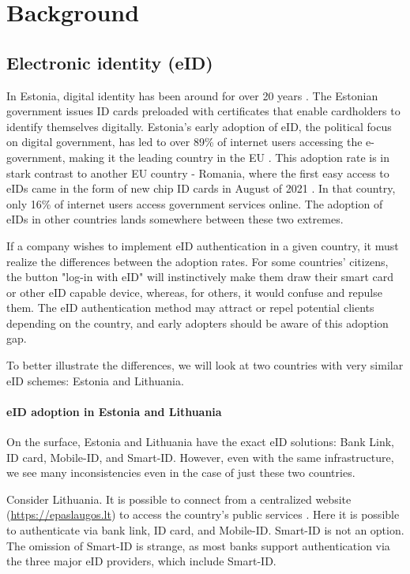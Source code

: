 \section{Background}

\subsection{Electronic identity (eID)}

In Estonia, digital identity has been around for over 20 years \cite{eelaw-idcard}. The Estonian government issues ID cards preloaded with certificates that enable cardholders to identify themselves digitally. Estonia's early adoption of eID, the political focus on digital government, has led to over 89\% of internet users accessing the e-government, making it the leading country in the EU \cite{eu-desi}. This adoption rate is in stark contrast to another EU country - Romania, where the first easy access to eIDs came in the form of new chip ID cards in August of 2021 \cite{romania-adopts-eid}. In that country, only 16\% of internet users access government services online. The adoption of eIDs in other countries lands somewhere between these two extremes.

If a company wishes to implement eID authentication in a given country, it must realize the differences between the adoption rates. For some countries' citizens, the button "log-in with eID" will instinctively make them draw their smart card or other eID capable device, whereas, for others, it would confuse and repulse them. The eID authentication method may attract or repel potential clients depending on the country, and early adopters should be aware of this adoption gap.

To better illustrate the differences, we will look at two countries with very similar eID schemes: Estonia and Lithuania.

\paragraph{eID adoption in Estonia and Lithuania}

On the surface, Estonia and Lithuania have the exact eID solutions: Bank Link, ID card, Mobile-ID, and Smart-ID. However, even with the same infrastructure, we see many inconsistencies even in the case of just these two countries.

Consider Lithuania. It is possible to connect from a centralized website (\url{https://epaslaugos.lt}) to access the country's public services \cite{eidasnode-lt}. Here it is possible to authenticate via bank link, ID card, and Mobile-ID. Smart-ID is not an option. The omission of Smart-ID is strange, as most banks support authentication via the three major eID providers, which include Smart-ID.

